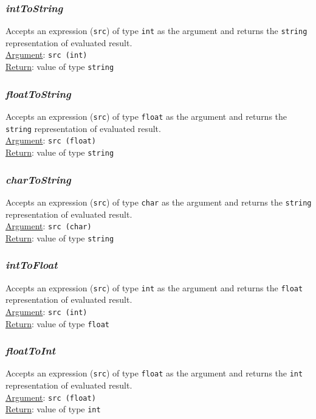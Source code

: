         \subsubsection{\textit{intToString}}
        Accepts an expression (\texttt{src}) of type \texttt{int} as the argument and returns the \texttt{string} representation of evaluated result.\\
        \underline{Argument}: \texttt{src (int)}\\
        \underline{Return}: value of type \texttt{string}

        \subsubsection{\textit{floatToString}}
        Accepts an expression (\texttt{src}) of type \texttt{float} as the argument and returns the \texttt{string} representation of evaluated result.\\
        \underline{Argument}: \texttt{src (float)}\\
        \underline{Return}: value of type \texttt{string}

        \subsubsection{\textit{charToString}}
        Accepts an expression (\texttt{src}) of type \texttt{char} as the argument and returns the \texttt{string} representation of evaluated result.\\
        \underline{Argument}: \texttt{src (char)}\\
        \underline{Return}: value of type \texttt{string}

        \subsubsection{\textit{intToFloat}}
        Accepts an expression (\texttt{src}) of type \texttt{int} as the argument and returns the \texttt{float} representation of evaluated result.\\
        \underline{Argument}: \texttt{src (int)}\\
        \underline{Return}: value of type \texttt{float}

        \subsubsection{\textit{floatToInt}}
        Accepts an expression (\texttt{src}) of type \texttt{float} as the argument and returns the \texttt{int} representation of evaluated result.\\
        \underline{Argument}: \texttt{src (float)}\\
        \underline{Return}: value of type \texttt{int}

